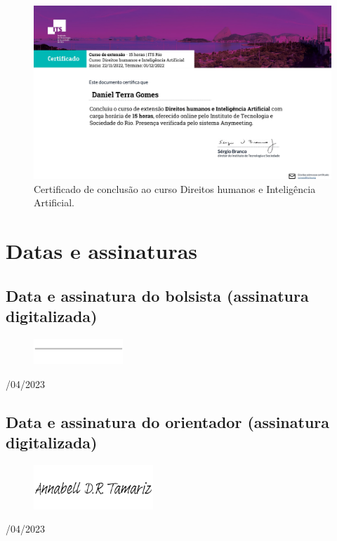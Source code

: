 \begin{figure}[H]
\centering
    \includegraphics[width=\textwidth]{Figures/its1.pdf}
\caption{Certificado de conclusão ao curso Direitos humanos e Inteligência Artificial.}
\label{Design}
\end{figure}



\chapter{Datas e assinaturas} \label{ass}

\section{Data e assinatura do bolsista (assinatura digitalizada)}


\begin{figure}[H]
 \centering
 \includegraphics[width=0.3\textwidth]{Figures/line.png}
\end{figure}
/04/2023

\section{Data e assinatura do orientador (assinatura digitalizada)}


\begin{figure}[H]
 \centering
 \includegraphics[width=0.4\textwidth]{Figures/assinatura_annabell.png}
\end{figure}
/04/2023

